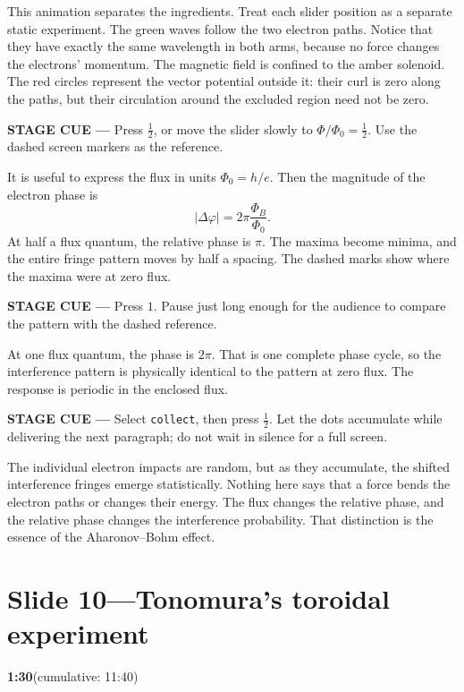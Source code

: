 \documentclass[a4paper,11pt]{article}
\newcommand{\slidetime}[2]{%
  {\small\sffamily\color{timegreen}\textbf{#1}\enspace(cumulative: #2)}%
}
\newcommand{\cue}[1]{%
  \par\smallskip
  \noindent
  {\small\sffamily\color{cueblue}\textbf{STAGE CUE ---} #1}
  \par\smallskip
}
\newenvironment{spoken}{%
  \begin{list}{}{%
    \setlength{\leftmargin}{1.1em}%
    \setlength{\rightmargin}{1.1em}%
    \setlength{\topsep}{2pt}%
    \setlength{\partopsep}{0pt}%
    \setlength{\parsep}{5pt}%
    \setlength{\itemsep}{0pt}}%
  \item\relax
}{\end{list}}
\newcommand{\slideheading}[4]{%
  \needspace{10\baselineskip}
  \section*{#1\enspace---\enspace#2}
  \vspace{-0.7em}
  \noindent\slidetime{#3}{#4}\par\smallskip
}
\begin{document}
\begin{spoken}
This animation separates the ingredients. Treat each slider position as a
separate static experiment. The green waves follow the two electron paths.
Notice that they have exactly the same wavelength in both arms, because no
force changes the electrons' momentum. The magnetic field is confined to the
amber solenoid. The red circles represent the vector potential outside it:
their curl is zero along the paths, but their circulation around the excluded
region need not be zero.
\end{spoken}

\cue{Press \(\tfrac12\), or move the slider slowly to
\(\Phi/\Phi_0=\tfrac12\). Use the dashed screen markers as the reference.}

\begin{spoken}
It is useful to express the flux in units
\(\Phi_0=h/e\). Then the magnitude of the electron phase is
\[
  |\Delta\varphi|=2\pi\frac{\Phi_B}{\Phi_0}.
\]
At half a flux quantum, the relative phase is \(\pi\). The maxima become
minima, and the entire fringe pattern moves by half a spacing. The dashed
marks show where the maxima were at zero flux.
\end{spoken}

\cue{Press \(1\). Pause just long enough for the audience to compare the
pattern with the dashed reference.}

\begin{spoken}
At one flux quantum, the phase is \(2\pi\). That is one complete phase cycle,
so the interference pattern is physically identical to the pattern at zero
flux. The response is periodic in the enclosed flux.
\end{spoken}

\cue{Select \texttt{collect}, then press \(\tfrac12\). Let the dots accumulate
while delivering the next paragraph; do not wait in silence for a full screen.}

\begin{spoken}
The individual electron impacts are random, but as they accumulate, the
shifted interference fringes emerge statistically. Nothing here says that a
force bends the electron paths or changes their energy. The flux changes the
relative phase, and the relative phase changes the interference probability.
That distinction is the essence of the Aharonov--Bohm effect.
\end{spoken}


\slideheading{Slide 10}{Tonomura's toroidal experiment}{1:30}{11:40}
\end{document}
